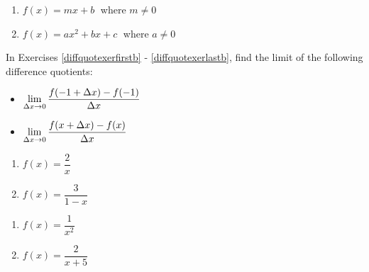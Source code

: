 \begin{multicols}{2}
\begin{enumerate}
\setcounter{enumi}{\value{HW}}

\item $f(x) = mx + b\;$ where $m \neq 0$
\item $f(x) = ax^{2} + bx + c\;$ where $a \neq 0$  \label{diffquotexerlasta}

\setcounter{HW}{\value{enumi}}
\end{enumerate}
\end{multicols}


In Exercises \ref{diffquotexerfirstb} - \ref{diffquotexerlastb}, find the limit of the following difference quotients:

\begin{multicols}{2}

\begin{itemize}

\item  $\displaystyle{\lim_{\Delta x \rightarrow 0} \dfrac{f(-1+\Delta x) - f(-1)}{\Delta x}}$

\item  $\displaystyle{\lim_{\Delta x \rightarrow 0} \dfrac{f(x+\Delta x) - f(x)}{\Delta x}}$

\end{itemize}

\end{multicols}

\begin{multicols}{2}
\begin{enumerate}
\setcounter{enumi}{\value{HW}}

\item $f(x) = \dfrac{2}{x}$  \label{diffquotexerfirstb}
\item $f(x) = \dfrac{3}{1-x}$

\setcounter{HW}{\value{enumi}}
\end{enumerate}
\end{multicols}

\begin{multicols}{2}
\begin{enumerate}
\setcounter{enumi}{\value{HW}}

\item  $f(x) = \dfrac{1}{x^2}$
\item  $f(x) = \dfrac{2}{x+5}$

\setcounter{HW}{\value{enumi}}
\end{enumerate}
\end{multicols}

